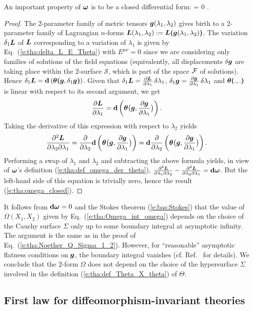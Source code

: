 An important property of $\bm{\omega}$ is to be a closed differential form:
\be \label{e:tha:omega_closed}
    \dd \w{\omega} = 0 .
\ee
\begin{proof}
The 2-parameter family of metric tensors $\bm{g}(\lambda_1,\lambda_2)$ gives birth
to a 2-parameter family of Lagrangian $n$-forms
$\bm{L}(\lambda_1,\lambda_2) := \bm{L}\textbf{(}\bm{g}(\lambda_1,\lambda_2)\textbf{)}$.
The variation $\delta_1\bm{L}$ of $\bm{L}$ corresponding to a variation of $\lambda_1$ is
given by Eq.~(\ref{e:tha:delta_L_E_Theta}) with $E^{\mu\nu} = 0$ since
we are considering only families of solutions of the field equations (equivalently,
all displacements $\delta\bm{g}$ are taking place within the 2-surface
$\mathcal{S}$, which is part of the space $\mathcal{F}$ of solutions). Hence
$\delta_1 \bm{L} = \mathbf{d} \left( \bm{\theta}\textbf{(}\bm{g}, \delta_1 \bm{g}\textbf{)} \right)$.
Given that $\delta_1 \bm{L} = \frac{\partial \bm{L}}{\partial \lambda_1}  \, \delta \lambda_1$,
$\delta_1 \bm{g} = \frac{\partial \bm{g}}{\partial \lambda_1} \, \delta \lambda_1$
and $\bm{\theta}\textbf{(} .,.\textbf{)}$ is linear with respect to its second argument, we get
\[
    \frac{\partial \bm{L}}{\partial \lambda_1} = \mathbf{d} \left( \bm{\theta} \bm{\big(}\bm{g},  \frac{\partial \bm{g}}{\partial \lambda_1} \bm{\big)} \right) .
\]
Taking the derivative of this expression with respect to $\lambda_2$ yields
\[
    \frac{\partial^2\bm{L}}{\partial\lambda_2\partial\lambda_1} = \frac{\partial }{\partial \lambda_2}
        \mathbf{d} \left( \bm{\theta} \bm{\big(}\bm{g},  \frac{\partial \bm{g}}{\partial \lambda_1} \bm{\big)} \right)
        = \mathbf{d}  \frac{\partial }{\partial \lambda_2} \left( \bm{\theta} \bm{\big(}\bm{g},  \frac{\partial \bm{g}}{\partial \lambda_1} \bm{\big)} \right) .
\]
Performing a swap of $\lambda_1$ and $\lambda_2$ and subtracting the above formula
yields, in view of $\bm{\omega}$'s definition (\ref{e:tha:def_omega_der_theta}),
$\frac{\partial^2\bm{L}}{\partial\lambda_1\partial\lambda_2} - \frac{\partial^2\bm{L}}{\partial\lambda_2\partial\lambda_1} = \mathbf{d}\bm{\omega}$. But the left-hand side of this equation
is trivially zero, hence the result (\ref{e:tha:omega_closed}).
\end{proof}
It follows from $\mathbf{d}\bm{\omega} = 0$ and the Stokes theorem (\ref{e:bas:Stokes})
that the value of $\Omega(X_1,X_2)$ given by Eq.~(\ref{e:tha:Omega_int_omega})
depends on the choice of the
Cauchy surface $\Sigma$ only up to some boundary integral at asymptotic infinity.
The argument is the same as in the proof of Eq.~(\ref{e:tha:Noether_Q_Sigma_1_2}).
However, for ``reasonable'' asymptotic flatness conditions on $\bm{g}$, the
boundary integral vanishes (cf. Ref.~\cite{IyerW94} for details). We conclude that
the 2-form $\Omega$ does not depend on the choice of the hypersurface
$\Sigma$ involved in the definition
(\ref{e:tha:def_Theta_X_theta}) of $\Theta$.




\subsection{First law for diffeomorphism-invariant theories}
















